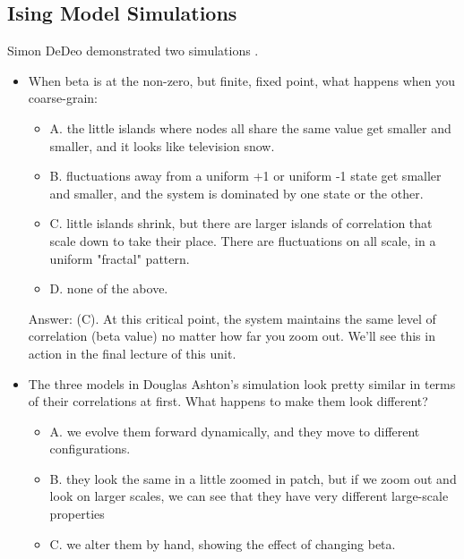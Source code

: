 \documentclass[]{article}
\begin{document}
\subsection{Ising Model Simulations}

Simon DeDeo demonstrated two simulations \cite{nottelmann2000ising,ashton2012renormalization}.

\begin{itemize}
	\item When beta is at the non-zero, but finite, fixed point, what happens when you coarse-grain:
	
	\begin{itemize}
		\item 	A. the little islands where nodes all share the same value get smaller and smaller, and it looks like television snow.
		
		\item B. fluctuations away from a uniform +1 or uniform -1 state get smaller and smaller, and the system is dominated by one state or the other.
		
		\item C. little islands shrink, but there are larger islands of correlation that scale down to take their place. There are fluctuations on all scale, in a uniform "fractal" pattern.
		
		\item D. none of the above.
	\end{itemize}
	
	Answer: (C). At this critical point, the system maintains the same level of correlation (beta value) no matter how far you zoom out. We'll see this in action in the final lecture of this unit.
	

	
	\item The three models in Douglas Ashton's simulation look pretty similar in terms of their correlations at first. What happens to make them look different?
	
	\begin{itemize}
		\item 	A. we evolve them forward dynamically, and they move to different configurations.
		
		\item B. they look the same in a little zoomed in patch, but if we zoom out and look on larger scales, we can see that they have very different large-scale properties
		
		\item C.  we alter them by hand, showing the effect of changing beta.
		

\end{itemize}
\end{itemize}
\end{document}
